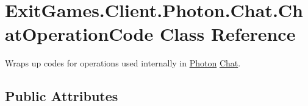 \hypertarget{class_exit_games_1_1_client_1_1_photon_1_1_chat_1_1_chat_operation_code}{}\section{Exit\+Games.\+Client.\+Photon.\+Chat.\+Chat\+Operation\+Code Class Reference}
\label{class_exit_games_1_1_client_1_1_photon_1_1_chat_1_1_chat_operation_code}


Wraps up codes for operations used internally in \hyperlink{namespace_exit_games_1_1_client_1_1_photon}{Photon} \hyperlink{namespace_exit_games_1_1_client_1_1_photon_1_1_chat}{Chat}.  


\subsection*{Public Attributes}
